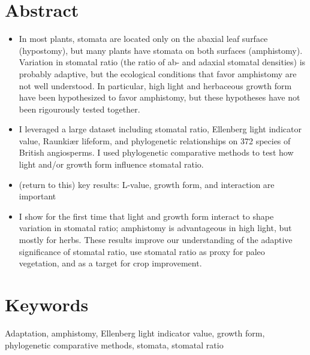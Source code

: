 \documentclass[12pt, oneside]{article}
\newcommand{\stretchy}{2}
\newcommand{\el}{L-value}
\begin{document}
\linenumbers
\setstretch{\stretchy}


\section*{Abstract}


\begin{itemize}
	\item In most plants, stomata are located only on the abaxial leaf surface (hypostomy), but many plants have stomata on both surfaces (amphistomy). Variation in stomatal ratio (the ratio of ab- and adaxial stomatal densities) is probably adaptive, but the ecological conditions that favor amphistomy are not well understood. In particular, high light and herbaceous growth form have been hypothesized to favor amphistomy, but these hypotheses have not been rigourously tested together.
	\item I leveraged a large dataset including stomatal ratio, Ellenberg light indicator value, Raunki\ae r lifeform, and phylogenetic relationships on 372 species of British angiosperms. I used phylogenetic comparative methods to test how light and/or growth form influence stomatal ratio.
	\item (return to this) key results: \el, growth form, and interaction are important
	\item I show for the first time that light and growth form interact to shape variation in stomatal ratio; amphistomy is advantageous in high light, but mostly for herbs. These results improve our understanding of the adaptive significance of stomatal ratio, use stomatal ratio as proxy for paleo vegetation, and as a target for crop improvement.
\end{itemize}


\section*{Keywords}

Adaptation, amphistomy, Ellenberg light indicator value, growth form, phylogenetic comparative methods, stomata, stomatal ratio
\end{document}
